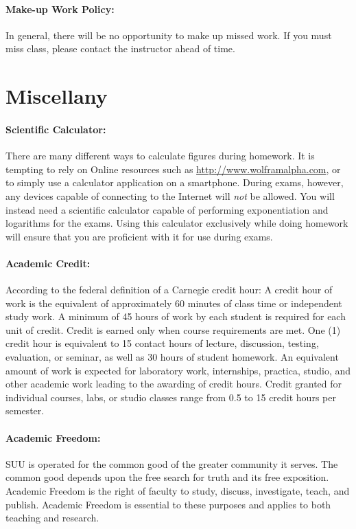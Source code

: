 \documentclass[12pt, letterpaper]{article}
\begin{document}
\paragraph{Make-up Work Policy:}
In general, there will be no opportunity to make up missed work. If you must miss class, please contact the instructor ahead of time.

\section*{Miscellany}

\paragraph{Scientific Calculator:}
There are many different ways to calculate figures during homework. It is tempting to rely on Online resources such as \href{http://www.wolframalpha.com}{http://www.wolframalpha.com}, or to simply use a calculator application on a smartphone. During exams, however, any devices capable of connecting to the Internet will \emph{not} be allowed. You will instead need a scientific calculator capable of performing exponentiation and logarithms for the exams. Using this calculator exclusively while doing homework will ensure that you are proficient with it for use during exams.

\paragraph{Academic Credit:}
According to the federal definition of a Carnegie credit hour: A credit hour of work is the equivalent of approximately 60 minutes of class time or independent study work. A minimum of 45 hours of work by each student is required for each unit of credit. Credit is earned only when course requirements are met. One (1) credit hour is equivalent to 15 contact hours of lecture, discussion, testing, evaluation, or seminar, as well as 30 hours of student homework. An equivalent amount of work is expected for laboratory work, internships, practica, studio, and other academic work leading to the awarding of credit hours. Credit granted for individual courses, labs, or studio classes range from 0.5 to 15 credit hours per semester.

\paragraph{Academic Freedom:}
SUU is operated for the common good of the greater community it serves. The common good depends upon the free search for truth and its free exposition. Academic Freedom is the right of faculty to study, discuss, investigate, teach, and publish. Academic Freedom is essential to these purposes and applies to both teaching and research. 
\end{document}
